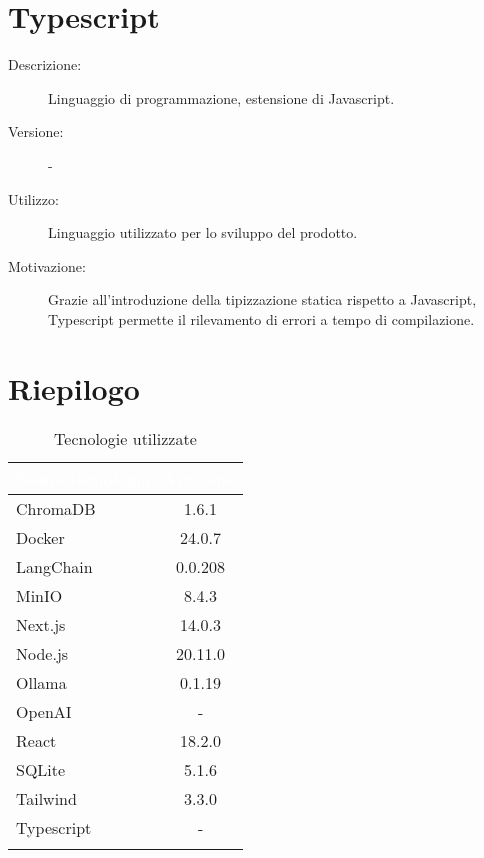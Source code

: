 \section{Typescript}
\begin{description}
\item[Descrizione:] Linguaggio di programmazione, estensione di Javascript.
\item[Versione:] -
\item[Utilizzo:] Linguaggio utilizzato per lo sviluppo del prodotto.
\item[Motivazione:] Grazie all'introduzione della tipizzazione statica rispetto a Javascript, Typescript permette il rilevamento di errori a tempo di compilazione.
\end{description}

\section{Riepilogo} \label{sec:riepilogotech}

\begingroup
\setlength{\tabcolsep}{10pt}
\renewcommand{\arraystretch}{1.5}
\begin{xltabular}{0.5\textwidth}{| X | c |}
    \hline
     \textbf{\textcolor{white}{Nome tecnologia}} & \textbf{\textcolor{white}{Versione}} \\
    \hline
    \endhead
    ChromaDB & 1.6.1\\
    \hline
    Docker & 24.0.7\\
    \hline
    LangChain & 0.0.208\\
    \hline
    MinIO & 8.4.3\\
    \hline
    Next.js & 14.0.3\\
    \hline
    Node.js & 20.11.0\\
    \hline
    Ollama & 0.1.19\\
    \hline
    OpenAI & -\\
    \hline
    React & 18.2.0\\
    \hline
    SQLite & 5.1.6\\
    \hline
    Tailwind & 3.3.0\\
    \hline
    Typescript & -\\
    \hline
     \caption{Tecnologie utilizzate}
    \label{tab:reqimp}
\end{xltabular}
\endgroup